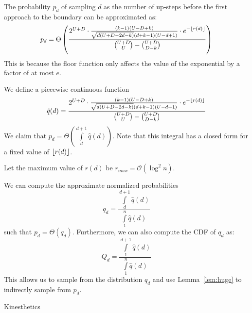 \begin{corollary}
\label{cor:ReturnProbabilityRounding}
The probability $p_d$ of sampling $d$ as the number of up-steps
before the first approach to the boundary can be approximated as:
\[
p_d = \Theta\left( \frac{ 2^{U+D}\cdot\frac{(k-1)(U-D+k)}{\sqrt{d(U+D-2d-k)}(d+k-1)(U-d+1)}\cdot
\mathlarger e^{-\floor{r(d)}} }{\binom{U+D}{U}-\binom{U+D}{D-k}} \right)
\]
This is because the floor function only affects the value of the exponential by a factor of at most $e$.
\end{corollary}
\begin{corollary}
\label{cor:ReturnProbabilityPiecewiseContinuous}
We define a piecewise continuous function
\[
\hat q(d) = \frac{ 2^{U+D}\cdot\frac{(k-1)(U-D+k)}{\sqrt{d(U+D-2d-k)}(d+k-1)(U-d+1)}\cdot
\mathlarger e^{-\floor{r(d)}} }{\binom{U+D}{U}-\binom{U+D}{D-k}}
\]
We claim that $p_d = \Theta\left( \int\limits_d^{d+1} \hat q(d)\right)$.
Note that this integral has a closed form for a fixed value of $\lfloor r(d)\rfloor$.
\end{corollary}


Let the maximum value of $r(d)$ be $r_{max} = \mathcal O(\log^2 n)$.
\begin{corollary}
\label{cor:}
We can compute the approximate normalized probabilities
\[
q_d = \frac{\int\limits_d^{d+1} \hat q(d)}{\int\limits_1^{n} \hat q(d)}
\]
such that $p_d = \Theta(q_d)$.
Furthermore, we can also compute the CDF of $q_d$ as:
\[
Q_d = \frac{\int\limits_1^{d+1} \hat q(d)}{\int\limits_1^{n} \hat q(d)}
\]
This allows us to sample from the distribution $q_d$ and use Lemma~\ref{lem:huge} to indirectly sample from $p_d$.
\end{corollary}
\begin{theorem}
\label{thm:first_return_in_interval}
Kinesthetics
\end{theorem}




